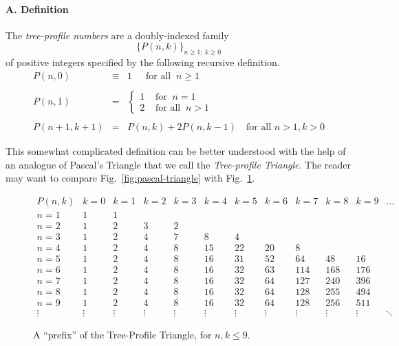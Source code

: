 \paragraph{\small\sf A. Definition}

The {\it tree-profile numbers} are a doubly-indexed family
\[ \big\{ P(n,k) \big\}_{n \geq 1; \ k \geq 0}  \]
of positive integers specified by the following recursive definition.
\begin{equation}
\label{eq:TP-defn}
\begin{array}{ccl}
P(n,0) & \equiv & 1 \ \ \ \ \ \mbox{ for all } \ n \geq 1 \\
  & & \\
P(n,1) & = &
  {\displaystyle
\left\{
\begin{array}{cl}
 1 & \mbox{ for } \ n=1 \\
 2 & \mbox{ for all } \ n > 1
\end{array}
\right.  } \\
  & & \\
P(n+1, k+1) & = & P(n,k) + 2 P(n, k-1) \ \ \  \mbox{ for all } n > 1, k > 0
\end{array}
\end{equation}

This somewhat complicated definition can be better understood with the
help of an analogue of Pascal's Triangle that we call the {\it
  Tree-profile Triangle}.  The reader may want to compare
Fig.~\ref{fig:pascal-triangle} with Fig.~\ref{fig:TP-triangle}.

\begin{figure}[htb]
\[
\begin{array}{c||r|r|r|r|r|r|r|r|r|r|r}
P(n, k) & k=0 & k=1 & k=2 & k=3 & k=4 & k=5 & k=6 & k=7 & k=8 & k=9 & \ldots \\
\hline
\hline
n=1 &  1 &  1 &    &    &     &     &     &     &     &     \\
\hline
n=2 &  1 &  2 &  3 &  2 &     &     &     &     &     &     \\
\hline
n=3 &  1 &  2 &  4 &  7 &   8 &   4 &     &     &     &     \\
\hline
n=4 &  1 &  2 &  4 &  8 &  15 &  22 &  20 &   8 &     &     \\
\hline
n=5 &  1 &  2 &  4 &  8 &  16 &  31 &  52 &  64 & 48  &  16 \\
\hline
n=6 &  1 &  2 &  4 &  8 &  16 &  32 &  63 & 114 & 168 & 176 \\
\hline
n=7 &  1 &  2 &  4 &  8 &  16 &  32 &  64 & 127 & 240 & 396 \\
\hline
n=8 &  1 &  2 &  4 &  8 &  16 &  32 &  64 & 128 & 255 & 494 \\
\hline
n=9 &  1 &  2 &  4 &  8 &  16 &  32 &  64 & 128 & 256 & 511 \\
\hline
\vdots &\vdots &\vdots &\vdots &\vdots &\vdots &\vdots &\vdots &\vdots
&\vdots &\vdots &\ddots
\end{array}
\] 
\caption{A ``prefix'' of the Tree-Profile Triangle, for $n,k \leq 9$.}
\label{fig:TP-triangle}
\end{figure}


